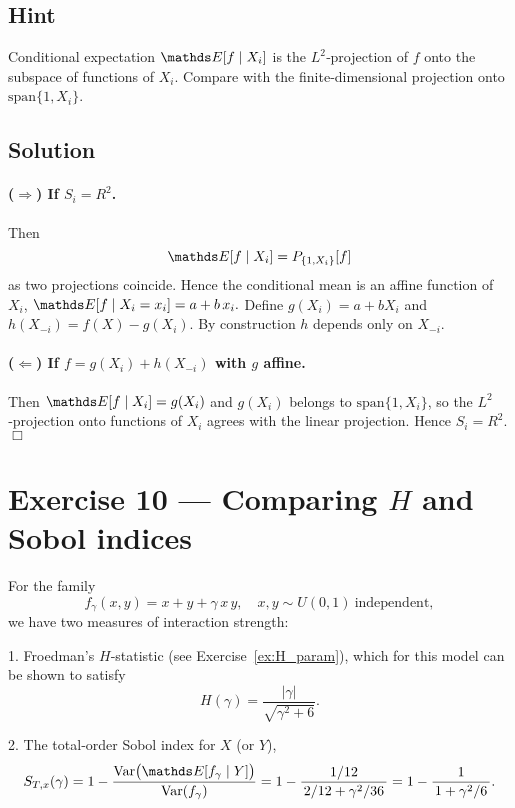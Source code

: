 \documentclass[a4paper]{article}
\begin{document}
\subsection*{Hint}
Conditional expectation $\E[f\mid X_i]$ is the $L^2$‐projection of $f$
onto the subspace of functions of $X_i$.  Compare with the finite‐dimensional
projection onto $\mathrm{span}\{1,X_i\}$.

\subsection*{Solution}

\paragraph{($\Rightarrow$) If $S_i=R^2$.}
Then 
\[
\E[f\mid X_i]
= P_{\{1,X_i\}}[f]
\]
as two projections coincide.  Hence the conditional mean is an affine
function of $X_i$,
\(
\E[f\mid X_i=x_i] = a + b\,x_i.
\)
Define $g(X_i)=a+bX_i$ and $h(X_{-i})=f(X)-g(X_i)$.  By construction
$h$ depends only on $X_{-i}$.

\paragraph{($\Leftarrow$) If $f=g(X_i)+h(X_{-i})$ with $g$ affine.}
Then
\(
\E[f\mid X_i] = g(X_i)
\)
and $g(X_i)$ belongs to $\mathrm{span}\{1,X_i\}$, so the
$L^2$‐projection onto functions of $X_i$ agrees with the linear projection.
Hence $S_i=R^2$.  \hfill\(\Box\)

\section*{Exercise 10 — Comparing $H$ and Sobol indices}
\label{ex:H_vs_Sobol_improved}

For the family
\[
f_\gamma(x,y)=x + y + \gamma\,x\,y,
\quad
x,y\sim U(0,1)\ \text{independent},
\]
we have two measures of interaction strength:

1. Froedman’s $H$‐statistic (see Exercise~\ref{ex:H_param}), which for this model
   can be shown to satisfy
   \[
   H(\gamma) = \frac{|\gamma|}{\sqrt{\gamma^2 + 6}}.
   \]

2. The total‐order Sobol index for $X$ (or $Y$),
   \[
   S_{T,x}(\gamma)
   = 1 - \frac{\text{Var}\bigl(\E[f_\gamma\mid Y]\bigr)}{\text{Var}(f_\gamma)}
   = 1 - \frac{1/12}{\,2/12 + \gamma^2/36\,}
   = 1 - \frac{1}{\,1 + \gamma^2/6\,}.
   \]
\end{document}
